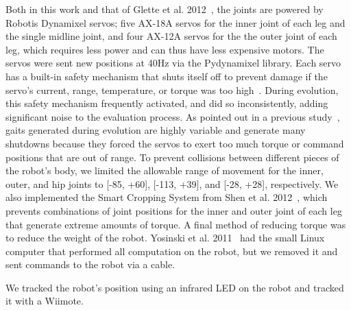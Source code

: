 Both in this work and that of Glette et al. 2012~\cite{glette}, the joints are powered by Robotis Dynamixel servos; five AX-18A servos for the inner joint of each leg and the single midline joint, and four AX-12A servos for the the outer joint of each leg, which requires less power and can thus have less expensive motors. The servos were sent new positions at 40Hz via the Pydynamixel library. Each servo has a built-in safety mechanism that shuts itself off to prevent damage if the servo's current, range, temperature, or torque was too high~\cite{robotis}. During evolution, this safety mechanism frequently activated, and did so inconsistently, adding significant noise to the evaluation process. As pointed out in a previous study~\cite{yos:clune}, gaits generated during evolution are highly variable and generate many shutdowns because they forced the servos to exert too much torque or command positions that are out of range. %
To prevent collisions between different pieces of the robot's body, we limited the allowable range of movement for the inner, outer, and hip joints to [-85\degree, +60\degree], [-113\degree, +39\degree], and [-28\degree, +28\degree], respectively. We also implemented the Smart Cropping System from Shen et al. 2012~\cite{haocheng}, which prevents combinations of joint positions for the inner and outer joint of each leg that generate extreme amounts of torque. A final method of reducing torque was to reduce the weight of the robot. Yosinski et al. 2011~\cite{yos:clune} had the small Linux computer that performed all computation on the robot, but we removed it and sent commands to the robot via a cable. 

We tracked the robot's position using an infrared LED on the robot and tracked it with a Wiimote.
